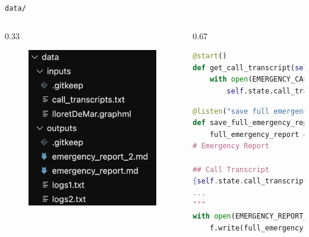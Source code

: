 \begin{frame}[fragile]{\texttt{data/}}
    \begin{columns}
        \begin{column}{0.33\textwidth}
            \begin{figure}
                \includegraphics[width=\textwidth]{figures/data_folder_structure.png}
            \end{figure}
        \end{column}
        \begin{column}{0.67\textwidth}
        
    
            \begin{lstlisting}[language=Python]
@start()
def get_call_transcript(self):
    with open(EMERGENCY_CALL_TRANSCRIPTS_FILENAME, "r") as f:
        self.state.call_transcript = f.readlines()[TRANSCRIPT_INDEX]
            \end{lstlisting}
            \begin{lstlisting}[language=Python]
@listen("save full emergency report")
def save_full_emergency_report(self):
    full_emergency_report = f"""
# Emergency Report

## Call Transcript
{self.state.call_transcript}
...
"""
with open(EMERGENCY_REPORT_FILENAME, "w") as f:
    f.write(full_emergency_report)
            \end{lstlisting}
        \end{column}
    \end{columns}
\end{frame}